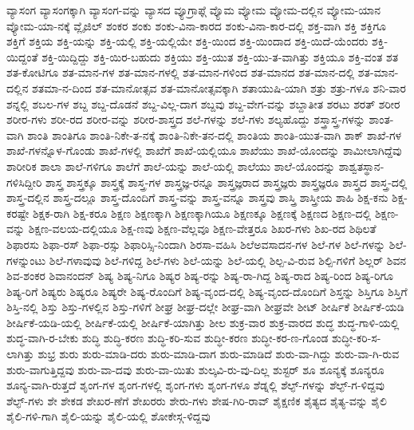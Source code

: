 {ವ್ಯಾಸಂಗ
ವ್ಯಾಸಂಗಕ್ಕಾಗಿ
ವ್ಯಾಸಂಗ-ವನ್ನು
ವ್ಯಾಸದ
ವ್ಯೂಗ್ರಾಫ್ಗೆ
ವ್ಯೊಮ
ವ್ಯೋಮ
ವ್ಯೋಮ-ದಲ್ಲಿನ
ವ್ಯೋಮ-ಯಾನ
ವ್ಯೋಮ-ಯಾ-ನಕ್ಕೆ
ವ್ಲೈಜಿಲ್
ಶಂಕರ
ಶಂಕು
ಶಂಕು-ವಿನಾ-ಕಾರದ
ಶಂಕು-ವಿನಾ-ಕಾರ-ದಲ್ಲಿ
ಶಕ್ತ-ವಾಗಿ
ಶಕ್ತಿ
ಶಕ್ತಿಗೂ
ಶಕ್ತಿಗೆ
ಶಕ್ತಿಯ
ಶಕ್ತಿ-ಯನ್ನು
ಶಕ್ತಿ-ಯಲ್ಲಿ
ಶಕ್ತಿ-ಯಲ್ಲಿಯೇ
ಶಕ್ತಿ-ಯಿಂದ
ಶಕ್ತಿ-ಯಿಂದಾದ
ಶಕ್ತಿ-ಯಿದೆ-ಯೆಂದರು
ಶಕ್ತಿ-ಯಿದ್ದಂತೆ
ಶಕ್ತಿ-ಯಿದ್ದಿದ್ದು
ಶಕ್ತಿ-ಯಿರ-ಬಹುದು
ಶಕ್ತಿಯು
ಶಕ್ತಿ-ಯುತ
ಶಕ್ತಿ-ಯು-ತ-ವಾಗಿತ್ತು
ಶಕ್ತಿಯೂ
ಶಕ್ತಿ-ವಂತ
ಶತ
ಶತ-ಕೋಟಿಗೂ
ಶತ-ಮಾನ-ಗಳ
ಶತ-ಮಾನ-ಗಳಲ್ಲಿ
ಶತ-ಮಾನ-ಗಳಿಂದ
ಶತ-ಮಾನದ
ಶತ-ಮಾನ-ದಲ್ಲಿ
ಶತ-ಮಾನ-ದಲ್ಲಿನ
ಶತಮಾ-ನ-ದಿಂದ
ಶತ-ಮಾನೋತ್ಸವ
ಶತ-ಮಾನೋತ್ಸವಕ್ಕಾಗಿ
ಶತಾಯುಷಿ-ಯಾಗಿ
ಶತ್ರು
ಶತ್ರು-ಗಳೂ
ಶನಿ-ವಾರ
ಶನ್ನಲ್ಲಿ
ಶಬಲ-ಗಳ
ಶಬ್ದ
ಶಬ್ದ-ದೊಡನೆ
ಶಬ್ದ-ವಿಲ್ಲ-ದಾಗ
ಶಬ್ದವು
ಶಬ್ದ-ವೇಗ-ವನ್ನು
ಶಬ್ದಾತೀತ
ಶರಟು
ಶರತ್
ಶರೀರ
ಶರೀರ-ಗಳು
ಶರೀ-ರದ
ಶರೀರ-ವನ್ನು
ಶರೀರ-ಶಾಸ್ತ್ರದ
ಶಲೆ-ಗಳನ್ನು
ಶಲೆ-ಗಳು
ಶಲ್ಯಹೊದ್ದು
ಶಸ್ತ್ರಾಸ್ತ್ರ-ಗಳನ್ನು
ಶಾಂತ-ವಾಗಿ
ಶಾಂತಿ
ಶಾಂತಿಗೂ
ಶಾಂತಿ-ನಿಕೇ-ತ-ನಕ್ಕೆ
ಶಾಂತಿ-ನಿಕೇ-ತನ-ದಲ್ಲಿ
ಶಾಂತಿಯ
ಶಾಂತಿ-ಯುತ-ವಾಗಿ
ಶಾಕ್
ಶಾಖೆ-ಗಳ
ಶಾಖೆ-ಗಳನ್ನೊಳ-ಗೊಂಡು
ಶಾಖೆ-ಗಳಲ್ಲಿ
ಶಾಖೆಗೆ
ಶಾಖೆ-ಯಲ್ಲಿಯೂ
ಶಾಖೆಯು
ಶಾಖೆ-ಯೊಂದನ್ನು
ಶಾಮೀಲಾಗಿದ್ದೆವು
ಶಾರೀರಿಕ
ಶಾಲಾ
ಶಾಲೆ-ಗಳಿಗೂ
ಶಾಲೆಗೆ
ಶಾಲೆ-ಯನ್ನು
ಶಾಲೆ-ಯಲ್ಲಿ
ಶಾಲೆಯು
ಶಾಲೆ-ಯೊಂದನ್ನು
ಶಾಶ್ವತಸ್ಥಾನ-ಗಳಿಸಿದ್ದೀರಿ
ಶಾಸ್ತ್ರ
ಶಾಸ್ತ್ರಕ್ಕೂ
ಶಾಸ್ತ್ರಕ್ಕೆ
ಶಾಸ್ತ್ರ-ಗಳ
ಶಾಸ್ತ್ರಜ್ಞ-ರನ್ನೂ
ಶಾಸ್ತ್ರಜ್ಞರಾದ
ಶಾಸ್ತ್ರಜ್ಞರು
ಶಾಸ್ತ್ರಜ್ಞರೂ
ಶಾಸ್ತ್ರದ
ಶಾಸ್ತ್ರ-ದಲ್ಲಿ
ಶಾಸ್ತ್ರ-ದಲ್ಲಿನ
ಶಾಸ್ತ್ರ-ದಲ್ಲೂ
ಶಾಸ್ತ್ರ-ದೊಂದಿಗೆ
ಶಾಸ್ತ್ರ-ವನ್ನು
ಶಾಸ್ತ್ರ-ವನ್ನೂ
ಶಾಸ್ತ್ರವು
ಶಾಸ್ತ್ರಿ
ಶಾಸ್ತ್ರೀಯ
ಶಾಹಿ
ಶಿಕ್ಷ-ಕನು
ಶಿಕ್ಷ-ಕರಷ್ಟೇ
ಶಿಕ್ಷಕ-ರಾಗಿ
ಶಿಕ್ಷ-ಕರೂ
ಶಿಕ್ಷಣ
ಶಿಕ್ಷಣಕ್ಕಾಗಿ
ಶಿಕ್ಷಣಕ್ಕಾಗಿಯೂ
ಶಿಕ್ಷಣಕ್ಕೂ
ಶಿಕ್ಷಣಕ್ಕೆ
ಶಿಕ್ಷಣದ
ಶಿಕ್ಷಣ-ದಲ್ಲಿ
ಶಿಕ್ಷಣ-ವನ್ನು
ಶಿಕ್ಷಣ-ವಲಯ-ದಲ್ಲಿಯೂ
ಶಿಕ್ಷ-ಣವು
ಶಿಕ್ಷಣ-ವೆಲ್ಲವೂ
ಶಿಕ್ಷಣ-ವೇತ್ತರೂ
ಶಿಖರ-ಗಳು
ಶಿಖ-ರದ
ಶಿಥಿಲತೆ
ಶಿಫಾರಸು
ಶಿಫಾ-ರಸ್
ಶಿಫಾ-ರಸ್ಸು
ಶಿಫಾರಿಸ್ಸಿ-ನಿಂದಾಗಿ
ಶಿರಸಾ-ವಹಿಸಿ
ಶಿಲೆಅವಸಾದನ-ಗಳ
ಶಿಲೆ-ಗಳ
ಶಿಲೆ-ಗಳನ್ನು
ಶಿಲೆ-ಗಳನ್ನುಂಟು
ಶಿಲೆ-ಗಳಾವುವು
ಶಿಲೆ-ಗಳಿದ್ದ
ಶಿಲೆ-ಗಳು
ಶಿಲೆ-ಯನ್ನು
ಶಿಲೆ-ಯಲ್ಲಿ
ಶಿಲ್ಪ-ವಿ-ರುವ
ಶಿಲ್ಪಿ-ಗಳಿಗೆ
ಶಿಲ್ಲರ್
ಶಿವನ
ಶಿವ-ಶಂಕರ
ಶಿವಾನಂದನ್
ಶಿಷ್ಯ
ಶಿಷ್ಯ-ನಿಗೂ
ಶಿಷ್ಯರ
ಶಿಷ್ಯ-ರನ್ನು
ಶಿಷ್ಯ-ರಾ-ಗಿದ್ದ
ಶಿಷ್ಯ-ರಾದ
ಶಿಷ್ಯ-ರಿಂದ
ಶಿಷ್ಯ-ರಿಗೂ
ಶಿಷ್ಯ-ರಿಗೆ
ಶಿಷ್ಯರು
ಶಿಷ್ಯರೂ
ಶಿಷ್ಯರೇ
ಶಿಷ್ಯ-ರೊಂದಿಗೆ
ಶಿಷ್ಯ-ವೃಂದ-ದಲ್ಲಿ
ಶಿಷ್ಯ-ವೃಂದ-ದೊಂದಿಗೆ
ಶಿಸ್ತನ್ನು
ಶಿಸ್ತಿಗೂ
ಶಿಸ್ತಿಗೆ
ಶಿಸ್ತಿ-ನಲ್ಲಿ
ಶಿಸ್ತು
ಶಿಸ್ತು-ಗಳಲ್ಲಿನ
ಶಿಸ್ತು-ಗಳಿಗೆ
ಶೀಘ್ರ
ಶೀಘ್ರ-ದಲ್ಲೇ
ಶೀಘ್ರ-ವಾಗಿ
ಶೀಘ್ರವೇ
ಶೀಟ್
ಶೀರ್ಷಿಕೆ
ಶೀರ್ಷಿಕೆ-ಯಡಿ
ಶೀರ್ಷಿಕೆ-ಯಡಿ-ಯಲ್ಲಿ
ಶೀರ್ಷಿಕೆ-ಯಲ್ಲಿ
ಶೀರ್ಷಿಕೆ-ಯಾಗಿತ್ತು
ಶೀಲ
ಶುಕ್ರ-ವಾರ
ಶುಕ್ರ-ವಾರದ
ಶುದ್ಧ
ಶುದ್ಧ-ಗಾಳಿ-ಯಲ್ಲಿ
ಶುದ್ಧ-ವಾಗಿ-ರ-ಬೇಕು
ಶುದ್ಧಿ
ಶುದ್ಧಿ-ಕರಣ
ಶುದ್ಧಿ-ಕರಿ-ಸುವ
ಶುದ್ಧೀ-ಕರಣ
ಶುದ್ಧೀ-ಕರ-ಣ-ಗೊಂಡ
ಶುದ್ಧೀ-ಕರಿ-ಸ-ಲಾಗಿತ್ತು
ಶುಭ್ರ
ಶುರು
ಶುರು-ಮಾಡಿ-ದರು
ಶುರು-ಮಾಡಿ-ದಾಗ
ಶುರು-ಮಾಡಿದೆ
ಶುರು-ವಾ-ಗಿದ್ದು
ಶುರು-ವಾ-ಗಿ-ರುವ
ಶುರು-ವಾಗುತ್ತಿದ್ದವು
ಶುರು-ವಾ-ದವು
ಶುರು-ವಾ-ಯಿತು
ಶುಲ್ಕವಿ-ರು-ವು-ದಿಲ್ಲ
ಶುಸ್ಟರ್
ಶೂ
ಶೂನ್ಯಕ್ಕೆ
ಶೂನ್ಯರೂ
ಶೂನ್ಯ-ವಾಗಿ-ರುತ್ತದೆ
ಶೃಂಗ-ಗಳ
ಶೃಂಗ-ಗಳಲ್ಲಿ
ಶೃಂಗ-ಗಳು
ಶೃಂಗ-ಗಳೂ
ಶೆಡ್ನಲ್ಲಿ
ಶೆಲ್ಫ್-ಗಳನ್ನು
ಶೆಲ್ಫ್-ಗ-ಳಿದ್ದವು
ಶೆಲ್ಫ್-ಗಳು
ಶೇ
ಶೇಕಡ
ಶೇಖರ-ಣೆಗೆ
ಶೇಖರರು
ಶೇರು-ಗಳು
ಶೇಷ-ಗಿರಿ-ರಾವ್
ಶೈಕ್ಷಣಿಕ
ಶೈತ್ಯದ
ಶೈತ್ಯ-ವನ್ನು
ಶೈಲಿ
ಶೈಲಿ-ಗಳಿ-ಗಾಗಿ
ಶೈಲಿ-ಯನ್ನು
ಶೈಲಿ-ಯಲ್ಲಿ
ಶೋಕೇಸ್ಗ-ಳಿದ್ದವು
}
